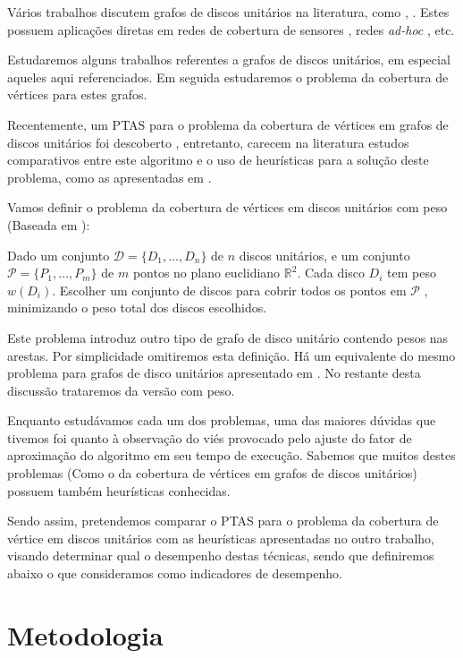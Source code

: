 Vários trabalhos discutem grafos de discos unitários na literatura, como \cite{clark1990unit}, \cite{marathe1995simple}. Estes possuem aplicações diretas em redes de cobertura de sensores \cite{Huang}, redes \textit{ad-hoc} \cite{kuhn2003ad}, etc.

Estudaremos alguns trabalhos referentes a grafos de discos unitários, em especial aqueles aqui referenciados. Em seguida estudaremos o problema da cobertura de vértices para estes grafos.

Recentemente, um PTAS para o problema da cobertura de vértices em grafos de discos unitários foi descoberto \cite{li}, entretanto, carecem na literatura estudos comparativos entre este algoritmo e o uso de heurísticas para a solução deste problema, como as apresentadas em \cite{marathe1995simple}.

Vamos definir o problema da cobertura de vértices em discos unitários com peso (Baseada em \cite{li}):

\begin{definition}
Dado um conjunto $\mathcal{D} = \{D_1, \ldots, D_n\}$ de $n$ discos unitários, e um conjunto $\mathcal{P} = \{P_1, \ldots, P_m\}$ de $m$ pontos no plano euclidiano $\mathbb{R}^2$. Cada disco $D_i$ tem peso $w(D_i)$. Escolher um conjunto de discos para cobrir todos os pontos em $\mathcal{P}$ , minimizando o peso total dos discos escolhidos. 
\end{definition}

Este problema introduz outro tipo de grafo de disco unitário contendo pesos nas arestas. Por simplicidade omitiremos esta definição. Há um equivalente do mesmo problema para grafos de disco unitários apresentado em \cite{li}. No restante desta discussão trataremos da versão com peso.

Enquanto estudávamos cada um dos problemas, uma das maiores dúvidas que tivemos foi quanto à observação do viés provocado pelo ajuste do fator de aproximação do algoritmo em seu tempo de execução. Sabemos que muitos destes problemas (Como o da cobertura de vértices em grafos de discos unitários) possuem também heurísticas conhecidas.

Sendo assim, pretendemos comparar o PTAS para o problema da cobertura de vértice em discos unitários com as heurísticas apresentadas no outro trabalho, visando determinar qual o desempenho destas técnicas, sendo que definiremos abaixo o que consideramos como indicadores de desempenho.

\section{Metodologia}

